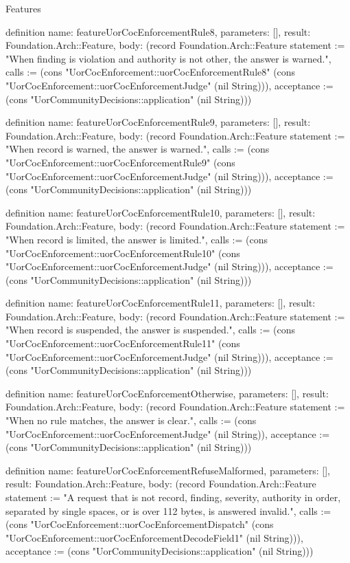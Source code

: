 \begin{lexlean}{Features}
\begin{semanticmodule}
definition{
  name: featureUorCocEnforcementRule8,
  parameters: [],
  result: Foundation.Arch::Feature,
  body: (record Foundation.Arch::Feature {statement := "When finding is violation and authority is not other, the answer is warned.", calls := (cons "UorCocEnforcement::uorCocEnforcementRule8" (cons "UorCocEnforcement::uorCocEnforcementJudge" (nil String))), acceptance := (cons "UorCommunityDecisions::application" (nil String))})
}

definition{
  name: featureUorCocEnforcementRule9,
  parameters: [],
  result: Foundation.Arch::Feature,
  body: (record Foundation.Arch::Feature {statement := "When record is warned, the answer is warned.", calls := (cons "UorCocEnforcement::uorCocEnforcementRule9" (cons "UorCocEnforcement::uorCocEnforcementJudge" (nil String))), acceptance := (cons "UorCommunityDecisions::application" (nil String))})
}

definition{
  name: featureUorCocEnforcementRule10,
  parameters: [],
  result: Foundation.Arch::Feature,
  body: (record Foundation.Arch::Feature {statement := "When record is limited, the answer is limited.", calls := (cons "UorCocEnforcement::uorCocEnforcementRule10" (cons "UorCocEnforcement::uorCocEnforcementJudge" (nil String))), acceptance := (cons "UorCommunityDecisions::application" (nil String))})
}

definition{
  name: featureUorCocEnforcementRule11,
  parameters: [],
  result: Foundation.Arch::Feature,
  body: (record Foundation.Arch::Feature {statement := "When record is suspended, the answer is suspended.", calls := (cons "UorCocEnforcement::uorCocEnforcementRule11" (cons "UorCocEnforcement::uorCocEnforcementJudge" (nil String))), acceptance := (cons "UorCommunityDecisions::application" (nil String))})
}

definition{
  name: featureUorCocEnforcementOtherwise,
  parameters: [],
  result: Foundation.Arch::Feature,
  body: (record Foundation.Arch::Feature {statement := "When no rule matches, the answer is clear.", calls := (cons "UorCocEnforcement::uorCocEnforcementJudge" (nil String)), acceptance := (cons "UorCommunityDecisions::application" (nil String))})
}

definition{
  name: featureUorCocEnforcementRefuseMalformed,
  parameters: [],
  result: Foundation.Arch::Feature,
  body: (record Foundation.Arch::Feature {statement := "A request that is not record, finding, severity, authority in order, separated by single spaces, or is over 112 bytes, is answered invalid.", calls := (cons "UorCocEnforcement::uorCocEnforcementDispatch" (cons "UorCocEnforcement::uorCocEnforcementDecodeField1" (nil String))), acceptance := (cons "UorCommunityDecisions::application" (nil String))})
}


\end{semanticmodule}
\end{lexlean}
